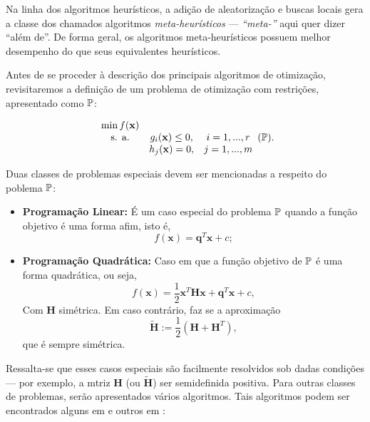 Na linha dos algoritmos heur\'{i}sticos, a adi\c{c}\~{a}o de aleatoriza\c{c}\~{a}o e buscas locais gera a classe dos chamados algoritmos \textit{meta-heur\'{i}sticos} --- \textit{``meta-''} aqui quer dizer ``al\'{e}m de''. De forma geral, os algoritmos meta-heur\'{i}sticos possuem melhor desempenho do que seus equivalentes heur\'{i}sticos.

Antes de se proceder \`{a} descri\c{c}\~{a}o dos principais algoritmos de otimiza\c{c}\~{a}o, revisitaremos a defini\c{c}\~{a}o de um problema de otimiza\c{c}\~{a}o com restri\c{c}\~{o}es, apresentado como $\mathbb{P}$:

\begin{equation}
\label{compProb2}
\begin{array}{ccc}
\min f(\mathbf{x}) & &\\
\text{s. a.} & g_i (\mathbf{x}) \le 0, & i = 1,...,r\\ 
 & h_j (\mathbf{x}) = 0, & j = 1,...,m
\end{array} (\mathbb{P}).
\end{equation}

Duas classes de problemas especiais devem ser mencionadas a respeito do poblema $\mathbb{P}$:

\begin{itemize}
\item \textbf{Programa\c{c}\~{a}o Linear:} \'{E} um caso especial do problema $\mathbb{P}$ quando a fun\c{c}\~{a}o objetivo \'{e} uma forma afim, isto \'{e},
\begin{equation*}
f(\mathbf{x}) = \mathbf{q}^T \mathbf{x} + c;
\end{equation*}
\item \textbf{Programa\c{c}\~{a}o Quadr\'{a}tica:} Caso em que a fun\c{c}\~{a}o objetivo de $\mathbb{P}$ \'{e} uma forma quadr\'{a}tica, ou seja,
\begin{equation*}
f(\mathbf{x}) = \frac{1}{2}\mathbf{x}^T \mathbf{Hx} + \mathbf{q}^T \mathbf{x} + c,
\end{equation*}
Com $\mathbf{H}$ sim\'{e}trica. Em caso contr\'{a}rio, faz se a aproxima\c{c}\~{a}o
\begin{equation*}
\tilde{\mathbf{H}} := \frac{1}{2} (\mathbf{H} + \mathbf{H}^T),
\end{equation*}
que \'{e} sempre sim\'{e}trica.
\end{itemize}

Ressalta-se que esses casos especiais s\~{a}o facilmente resolvidos sob dadas condi\c{c}\~{o}es --- por exemplo, a mtriz $\mathbf{H}$ (ou $\tilde{\mathbf{H}}$) ser semidefinida positiva. Para outras classes de problemas, ser\~{a}o apresentados v\'{a}rios algoritmos. Tais algoritmos podem ser encontrados alguns em \cite{guller} e outros em \cite{yang}:

